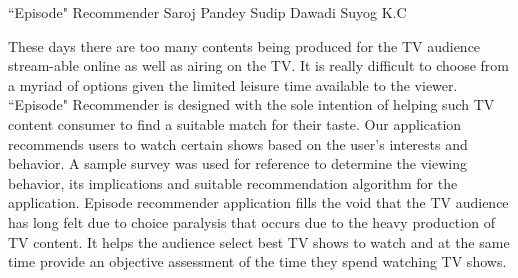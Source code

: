  \begin{conf-abstract}[]
 {``Episode" Recommender}
 {  Saroj Pandey
   Sudip Dawadi
  	Suyog K.C
 }
{}

These days there are too many contents being produced for the TV audience stream-able online as well as airing on the TV. It is really difficult to choose from a myriad of options given the limited leisure time available to the viewer. ``Episode" Recommender is designed with the sole intention of helping such TV content consumer to find a suitable match for their taste. Our application recommends users to watch certain shows based on the user's interests and behavior. A sample survey was used for reference to determine the viewing behavior, its implications and suitable recommendation algorithm for the application. Episode recommender application fills the void that the TV audience has long felt due to choice paralysis that occurs due to the heavy production of TV content. It helps the audience select best TV shows to watch and at the same time provide an objective assessment of the time they spend watching TV shows. 
 \end{conf-abstract}
